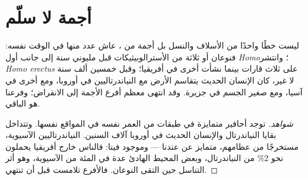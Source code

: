 \section{أجمة لا سلّم}

\begin{proposition}\label{prop:g12:human-evolution:bush}
 ليست خطًا واحدًا من الأسلاف والنسل بل أجمة من ،
عاش عدد منها في الوقت نفسه: فنوعان أو ثلاثة من الأسترالوبيثيكات قبل
مليوني سنة إلى جانب أول \emph{Homo}؛ وانتشر \emph{Homo erectus} على
ثلاث قارات بينما نشأت  أخرى في أفريقيا؛ وقبل خمسين ألف سنة لا
غير، كان الإنسان الحديث يتقاسم الأرض مع النياندرتاليين في أوروبا، ومع
 أخرى في آسيا، ومع  صغير الجسم في جزيرة. وقد انتهى معظم أفرع
الأجمة إلى الانقراض؛ وفرعنا هو الباقي.
\end{proposition}
\begin{proof}[شواهد]
توجد أحافير  متمايزة في طبقات من العمر نفسه في المواقع نفسها.
وتتداخل بقايا النياندرتال والإنسان الحديث في أوروبا آلاف السنين. 
النياندرتاليين  الآسيوية، مستخرجًا من عظامهم، متمايز عن 
عندنا --- وموجود فينا: فالناس خارج أفريقيا يحملون نحو 2\% من 
النياندرتال، وبعض  المحيط الهادئ عدة في المئة من  
الآسيوية، وهو أثر التناسل حين التقى النوعان. فالأفرع تلامست قبل أن
تنتهي.
\end{proof}


